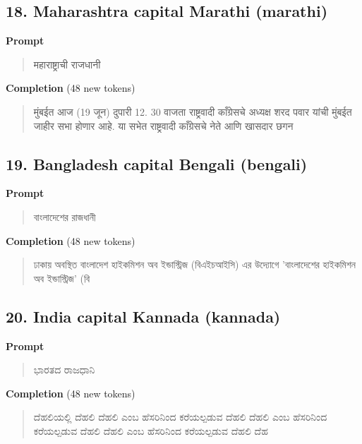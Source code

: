 \documentclass[10pt,a4paper]{article}
\begin{document}
\subsection*{18. Maharashtra capital Marathi (marathi)}
\textbf{Prompt}\par
\begin{quote}\small\raggedright \devanagarifont महाराष्ट्राची राजधानी\par\end{quote}
\textbf{Completion} (48 new tokens)\par
\begin{quote}\small\raggedright \devanagarifont मुंबईत आज (19 जून) दुपारी 12. 30 वाजता राष्ट्रवादी काँग्रेसचे अध्यक्ष शरद पवार यांची मुंबईत जाहीर सभा होणार आहे. या सभेत राष्ट्रवादी काँग्रेसचे नेते आणि खासदार छगन\par\end{quote}
\filbreak
\subsection*{19. Bangladesh capital Bengali (bengali)}
\textbf{Prompt}\par
\begin{quote}\small\raggedright \bengalifont বাংলাদেশের রাজধানী\par\end{quote}
\textbf{Completion} (48 new tokens)\par
\begin{quote}\small\raggedright \bengalifont \hspace*{0.5em}ঢাকায় অবস্থিত বাংলাদেশ হাইকমিশন অব ইন্ডাস্ট্রিজ (বিএইচআইসি) এর উদ্যোগে 'বাংলাদেশের হাইকমিশন অব ইন্ডাস্ট্রিজ' (বি\par\end{quote}
\filbreak
\subsection*{20. India capital Kannada (kannada)}
\textbf{Prompt}\par
\begin{quote}\small\raggedright \kannadafont ಭಾರತದ ರಾಜಧಾನಿ\par\end{quote}
\textbf{Completion} (48 new tokens)\par
\begin{quote}\small\raggedright \kannadafont \hspace*{0.5em}ದೆಹಲಿಯಲ್ಲಿ ದೆಹಲಿ ದೆಹಲಿ ಎಂಬ ಹೆಸರಿನಿಂದ ಕರೆಯಲ್ಪಡುವ ದೆಹಲಿ ದೆಹಲಿ ಎಂಬ ಹೆಸರಿನಿಂದ ಕರೆಯಲ್ಪಡುವ ದೆಹಲಿ ದೆಹಲಿ ಎಂಬ ಹೆಸರಿನಿಂದ ಕರೆಯಲ್ಪಡುವ ದೆಹಲಿ ದೆಹ\par\end{quote}
\filbreak
\end{document}
